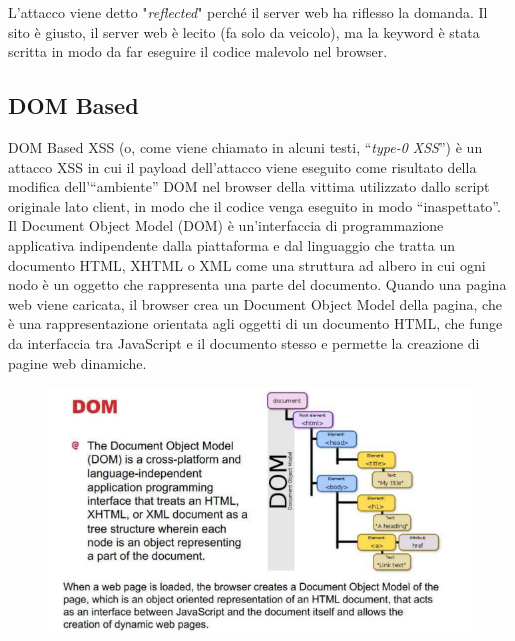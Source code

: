 L'attacco viene detto "\textit{reflected}" perché il server web ha riflesso la domanda. Il sito è giusto,
il server web è lecito (fa solo da veicolo), ma la keyword è stata scritta in modo da far eseguire il codice malevolo nel browser.

\subsection{DOM Based}

DOM Based XSS (o, come viene chiamato in alcuni testi, ``\textit{type-0 XSS}'') è un attacco XSS in
cui il payload dell'attacco viene eseguito come risultato della modifica dell'``ambiente'' DOM
nel browser della vittima utilizzato dallo script originale lato client, in modo che il codice
venga eseguito in modo ``inaspettato''.
Il Document Object Model (DOM) è un'interfaccia di programmazione applicativa indipendente dalla piattaforma e dal linguaggio che tratta un documento HTML, XHTML o XML come una struttura ad albero in cui ogni nodo è un oggetto che rappresenta una parte del documento.
Quando una pagina web viene caricata, il browser crea un Document Object Model della pagina, che è una rappresentazione orientata agli oggetti di un documento
HTML, che funge da interfaccia tra JavaScript e il documento stesso e permette la creazione di pagine web dinamiche.

\vspace{-1em}

\begin{figure}[H]
      \centering
      \includegraphics[width=\textwidth, keepaspectratio]{capitoli/secure_coding/img/cap_9/dom.png}
\end{figure}

\vspace{-2em}


